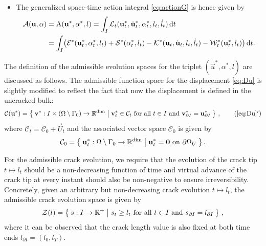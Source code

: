 \begin{itemize}
\item The generalized space-time action integral \eqref{eq:actionG} is hence given by
\begin{equation} \label{eq:actionGG}
\begin{aligned}
\mathcal{A}(\vec{u},\alpha) &= \mathrm{A}(\vec{u}^*,\alpha^*,l)=\int_I\mathcal{L}_t(\vec{u}^*_t,\dot{\vec{u}}^*_t,\alpha^*_t,l_t,\dot{l}_t)\,\mathrm{d}t \\
&= \int_I\bigr(\mathcal{E}^*(\vec{u}^*_t,\alpha_t^*,l_t)+\mathcal{S}^*(\alpha_t^*,l_t)-\mathcal{K}^*(\vec{u}_t,\dot{\vec{u}}_t,l_t,\dot{l}_t)-\mathcal{W}_t^*(\vec{u}^*_t,l_t)\bigr)\D{t}.
\end{aligned}
\end{equation}
\end{itemize}

The definition of the admissible evolution spaces for the triplet $(\vec{u}^*,\alpha^*,l)$ are discussed as follows. The admissible function space for the displacement \eqref{eq:Du} is slightly modified to reflect the fact that now the displacement is defined in the uncracked bulk:
\begin{align} \label{eq:Cu}
\mathcal{C}(\vec{u}^*)=\set{\vec{v}^*:I\times(\Omega\setminus\Gamma_0)\to\mathbb{R}^\mathrm{dim}|\vec{v}^*_t\in\mathcal{C}_t\text{ for all $t\in I$ and }\vec{v}^*_{\partial I}=\vec{u}^*_{\partial I}}\,, \tag{\ref*{eq:Du}${}^\prime$}
\end{align}
where $\mathcal{C}_t=\mathcal{C}_0+\vec{U}_t$ and the associated vector space $\mathcal{C}_0$ is given by
\[
\mathcal{C}_0=\set{\vec{u}^*_t:\Omega\setminus\Gamma_0\to\mathbb{R}^\mathrm{dim}|\vec{u}^*_t=\vec{0}\text{ on }\partial\Omega_U}.
\]

For the admissible crack evolution, we require that the evolution of the crack tip $t\mapsto l_t$ should be a non-decreasing function of time and virtual advance of the crack tip at every instant should also be non-negative to ensure irreversibility. Concretely, given an arbitrary but non-decreasing crack evolution $t\mapsto l_t$, the admissible crack evolution space is given by
\begin{equation} \label{eq:Dl}
\mathcal{Z}(l)=\Set{s:I\to\mathbb{R}^+|s_t\geq l_t\text{ for all $t\in I$ and }s_{\partial I}=l_{\partial I}}\,,
\end{equation}
where it can be observed that the crack length value is also fixed at both time ends $l_{\partial I}=(l_0,l_T)$.

